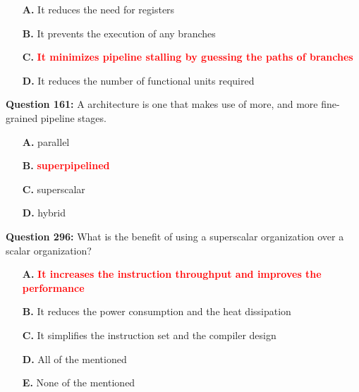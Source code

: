 \documentclass[12pt,a4paper]{article}
\begin{document}
\begin{itemize}
    \item[\textbf{A.}] It reduces the need for registers
    \item[\textbf{B.}] It prevents the execution of any branches
    \item[\textbf{C.}] \textcolor{red}{\textbf{It minimizes pipeline stalling by guessing the paths of branches}}
    \item[\textbf{D.}] It reduces the number of functional units required
\end{itemize}

\vspace{0.5cm}

\vspace{0.5cm}

\textbf{Question 161:} A \underline{\hspace{1.5cm}} architecture is one that makes use of more, and more fine-grained pipeline stages.

\begin{itemize}
    \item[\textbf{A.}] parallel
    \item[\textbf{B.}] \textcolor{red}{\textbf{superpipelined}}
    \item[\textbf{C.}] superscalar
    \item[\textbf{D.}] hybrid
\end{itemize}

\vspace{0.5cm}

\vspace{0.5cm}

\textbf{Question 296:} What is the benefit of using a superscalar organization over a scalar organization?

\begin{itemize}
    \item[\textbf{A.}] \textcolor{red}{\textbf{It increases the instruction throughput and improves the performance}}
    \item[\textbf{B.}] It reduces the power consumption and the heat dissipation
    \item[\textbf{C.}] It simplifies the instruction set and the compiler design
    \item[\textbf{D.}] All of the mentioned
    \item[\textbf{E.}] None of the mentioned
\end{itemize}

\vspace{0.5cm}
\end{document}
